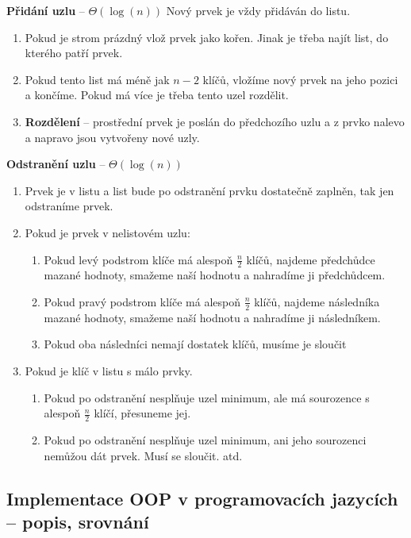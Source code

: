 \textbf{Přidání uzlu} -- $\Theta(\log(n))$ Nový prvek je vždy přidáván do listu.\\
\begin{enumerate}
\item Pokud je strom prázdný vlož prvek jako kořen. Jinak je třeba najít list, do kterého patří prvek.
\item Pokud tento list má méně jak $n-2$ klíčů, vložíme nový prvek na jeho pozici a končíme. Pokud má více je třeba tento uzel rozdělit.
\item \textbf{Rozdělení} -- prostřední prvek je poslán do předchozího uzlu a z prvko nalevo a napravo jsou vytvořeny nové uzly.
\end{enumerate}


\textbf{Odstranění uzlu} -- $\Theta(\log(n))$ \\
\begin{enumerate}
\item Prvek je v listu a list bude po odstranění prvku dostatečně zaplněn, tak jen odstraníme prvek.
\item Pokud je prvek v nelistovém uzlu:
	\begin{enumerate}
	\item Pokud levý podstrom klíče má alespoň $\frac{n}{2}$ klíčů, najdeme předchůdce mazané hodnoty, smažeme naší hodnotu a nahradíme ji předchůdcem.
	\item Pokud pravý podstrom klíče má alespoň $\frac{n}{2}$ klíčů,  najdeme následníka mazané hodnoty, smažeme naší hodnotu a nahradíme ji následníkem.
	\item Pokud oba následníci nemají dostatek klíčů, musíme je sloučit
	\end{enumerate}
\item Pokud je klíč v listu s málo prvky.
	\begin{enumerate}
	\item Pokud po odstranění nesplňuje uzel minimum, ale má sourozence s alespoň $\frac{n}{2}$ klíčí, přesuneme jej.
	\item Pokud po odstranění nesplňuje uzel minimum, ani jeho sourozenci nemůžou dát prvek. Musí se sloučit. atd.
	\end{enumerate}
\end{enumerate}



\subsection{Implementace OOP v programovacích jazycích – popis, srovnání}
